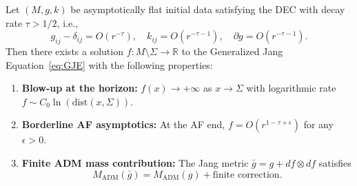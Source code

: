 \begin{theorem}\label{thm:GJE_Borderline}
Let $(M, g, k)$ be asymptotically flat initial data satisfying the DEC with decay rate $\tau > 1/2$, i.e.,
\[
g_{ij} - \delta_{ij} = O(r^{-\tau}), \quad k_{ij} = O(r^{-\tau-1}), \quad \partial g = O(r^{-\tau-1}).
\]
Then there exists a solution $f: M \setminus \Sigma \to \mathbb{R}$ to the Generalized Jang Equation~\eqref{eq:GJE} with the following properties:
\begin{enumerate}
    \item \textbf{Blow-up at the horizon:} $f(x) \to +\infty$ as $x \to \Sigma$ with logarithmic rate $f \sim C_0 \ln(\mathrm{dist}(x, \Sigma))$.
    \item \textbf{Borderline AF asymptotics:} At the AF end, $f = O(r^{1-\tau+\epsilon})$ for any $\epsilon > 0$.
    \item \textbf{Finite ADM mass contribution:} The Jang metric $\bar{g} = g + df \otimes df$ satisfies
    \[
    M_{\mathrm{ADM}}(\bar{g}) = M_{\mathrm{ADM}}(g) + \text{finite correction}.
    \]
\end{enumerate}
\end{theorem}

